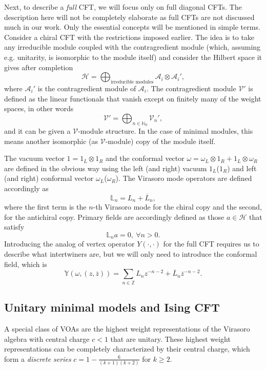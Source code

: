 \documentclass[twoside,11pt,titlepage]{amsart}
\renewcommand{\=}[1]{\stackrel{#1}{=}} %
\theoremstyle{definition}
\theoremstyle{remark}
\begin{document}
Next, to describe a \textit{full} CFT, we will focus only on full diagonal CFTs. The description here will not be completely elaborate as full CFTs are not discussed much in our work. Only the essential concepts will be mentioned in simple terms. Consider a chiral CFT with the restrictions imposed earlier. The idea is to take any irreducible module coupled with the contragredient module (which, assuming e.g. unitarity, is isomorphic to the module itself) and consider the Hilbert space it gives after completion
$$\mathcal{H}=\bigoplus_{\text{irreducible modules}} \mathcal{A}_i\otimes\mathcal{A}_i',$$
where $\mathcal{A}_i'$ is the contragredient module of $\mathcal{A}_i$. The contragredient module $\mathcal{V}'$ is defined as the linear functionals that vanish except on finitely many of the weight spaces, in other words
$$\mathcal{V}'=\bigoplus_{n \in \mathbb{N}_0} \mathcal{V}_n',$$
and it can be given a $\mathcal{V}$-module structure. In the case of minimal modules, this means another isomorphic (as $\mathcal{V}$-module) copy of the module itself. 

The vacuum vector $1=1_L\otimes1_R$ and the conformal vector $\omega=\omega_L\otimes1_R+1_L\otimes\omega_R$ are defined in the obvious way using the left (and right) vacuum $1_L$($1_R$) and left (and right) conformal vector $\omega_L$($\omega_R$). The Virasoro mode operators are defined accordingly as
$$\mathbb{L}_n=L_n+\overline{L}_n,$$
where the first term is the $n$-th Virasoro mode for the chiral copy and the second, for the antichiral copy. Primary fields are accordingly defined as those $a \in \mathcal{H}$ that satisfy 
$$\mathbb{L}_n a=0, \  \forall n>0.$$
Introducing the analog of vertex operator $Y(\cdot,\cdot)$ for the full CFT requires us to describe what intertwiners are, but we will only need to introduce the conformal field, which is
$$\mathbb{Y}(\omega,(z,\overline{z}))=\sum_{n \in \mathbb{Z}} L_nz^{-n-2}+\overline{L}_n\overline{z}^{-n-2}.$$


\subsection{Unitary minimal models and Ising CFT}\label{1.2}

\hfill \break 
A special class of VOAs are the highest weight representations of the Virasoro algebra with central charge $c<1$ that are unitary. These highest weight representations can be completely characterized by their central charge,  which form a \textit{discrete series} $c=1-\frac{6}{(k+1)(k+2)}$ for $k\geq 2$.   
\end{document}
